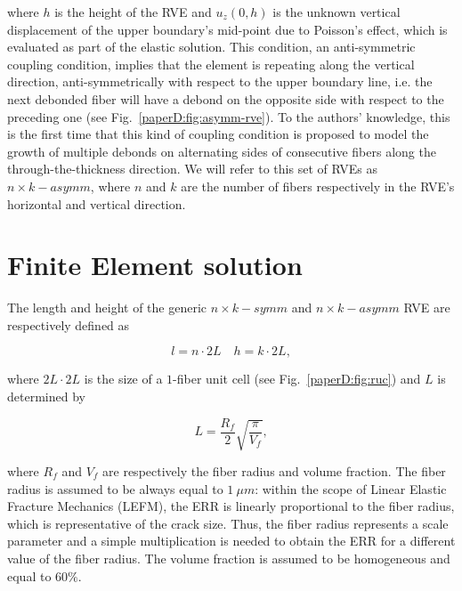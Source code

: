 where $h$ is the height of the RVE and $u_{z}\left(0,h\right)$ is the unknown vertical displacement of the upper boundary’s mid-point due to Poisson’s effect, which is evaluated as part of the elastic solution. This condition, an anti-symmetric coupling condition, implies that the element is repeating along the vertical direction, anti-symmetrically with respect to the upper boundary line, i.e. the next debonded fiber will have a debond on the opposite side with respect to the preceding one (see Fig.~\ref{paperD:fig:asymm-rve}). To the authors’ knowledge, this is the first time that this kind of coupling condition is proposed to model the growth of multiple debonds on alternating sides of consecutive fibers along the through-the-thickness direction. We will refer to this set of RVEs as $n \times k-asymm$, where $n$ and $k$ are the number of fibers respectively in the RVE’s horizontal and vertical direction.




\section{Finite Element solution}

The length and height of the generic $n \times k-symm$ and $n \times k-asymm$ RVE are respectively defined as

\begin{equation}
l=n\cdot2L\quad h=k\cdot2L,
\end{equation}

where $2L\cdot2L$ is the size of a $1$-fiber unit cell (see Fig.~\ref{paperD:fig:ruc}) and $L$ is determined by

\begin{equation}
L=\frac{R_{f}}{2}\sqrt{\frac{\pi}{V_{f}}},
\end{equation}

where $R_{f}$ and $V_{f}$ are respectively the fiber radius and volume fraction. The fiber radius is assumed to be always equal to $1\ μm$: within the scope of Linear Elastic Fracture Mechanics (LEFM), the ERR is linearly proportional to the fiber radius, which is representative of the crack size. Thus, the fiber radius represents a scale parameter and a simple multiplication is needed to obtain the ERR for a different value of the fiber radius. The volume fraction is assumed to be homogeneous and equal to $60\%$.

